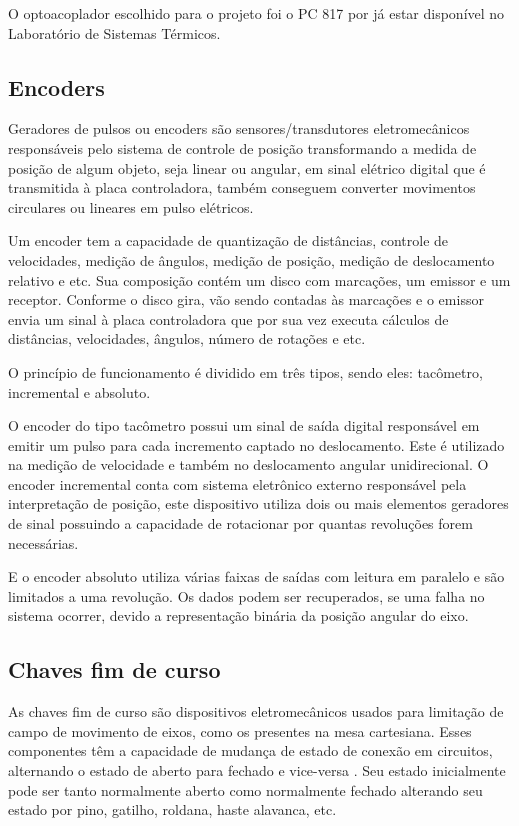 O optoacoplador escolhido para o projeto foi o PC 817 por já estar disponível no Laboratório de Sistemas 
Térmicos.

\subsection{Encoders}\label{subsec:metencoder}

Geradores de pulsos ou encoders são sensores/transdutores eletromecânicos responsáveis pelo sistema de 
controle de posição transformando a medida de posição de algum objeto, seja linear ou angular, em sinal 
elétrico digital que é transmitida à placa controladora, também conseguem converter movimentos circulares 
ou lineares em pulso elétricos.

Um encoder tem a capacidade de quantização de distâncias, controle de velocidades, medição de ângulos, 
medição de posição, medição de deslocamento relativo e etc. Sua composição contém um disco com marcações, 
um emissor e um receptor. Conforme o disco gira, vão sendo contadas às marcações e o emissor envia um sinal 
à placa controladora que por sua vez executa cálculos de distâncias, velocidades, ângulos, número de rotações 
e etc.

O princípio de funcionamento é dividido em três tipos, sendo eles: tacômetro, incremental e absoluto.

O encoder do tipo tacômetro possui um sinal de saída digital responsável em emitir um pulso para cada 
incremento captado no deslocamento. Este é utilizado na medição de velocidade e também no deslocamento 
angular unidirecional. O encoder incremental conta com sistema eletrônico externo responsável pela 
interpretação de posição, este dispositivo utiliza dois ou mais elementos geradores de sinal possuindo 
a capacidade de rotacionar por quantas revoluções forem necessárias.

E o encoder absoluto utiliza várias faixas de saídas com leitura em paralelo e são limitados a uma revolução. 
Os dados podem ser recuperados, se uma falha no sistema ocorrer, devido a representação binária da posição 
angular do eixo.

\subsection{Chaves fim de curso}\label{subsec:metchaves}

As chaves fim de curso são dispositivos eletromecânicos usados para limitação de campo de movimento de eixos, 
como os presentes na mesa cartesiana. Esses componentes têm a capacidade de mudança de estado de conexão 
em circuitos, alternando o estado de aberto para fechado e vice-versa \cite{alciatore2014introduccao}. 
Seu estado inicialmente pode ser tanto normalmente aberto como normalmente fechado alterando seu estado 
por pino, gatilho, roldana, haste alavanca, etc. 

